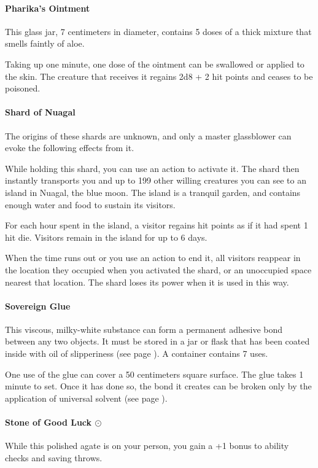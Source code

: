     \paragraph{Pharika's Ointment}
        This glass jar, 7 centimeters in diameter, contains 5 doses of a thick mixture that smells faintly of aloe.

        Taking up one minute, one dose of the ointment can be swallowed or applied to the skin.
        The creature that receives it regains 2d8 + 2 hit points and ceases to be poisoned.
    \paragraph{Shard of Nuagal}
        The origins of these shards are unknown, and only a master glassblower can evoke the following effects from it.

        While holding this shard, you can use an action to activate it.
        The shard then instantly transports you and up to 199 other willing creatures you can see to an island in Nuagal, the blue moon.
        The island is a tranquil garden, and contains enough water and food to sustain its visitors.

        For each hour spent in the island, a visitor regains hit points as if it had spent 1 hit die.
        Visitors remain in the island for up to 6 days.

        When the time runs out or you use an action to end it, all visitors reappear in the location they occupied when you activated the shard, or an unoccupied space nearest that location.
        The shard loses its power when it is used in this way.
    \paragraph{Sovereign Glue} \label{item::sovereignglue}
        This viscous, milky-white substance can form a permanent adhesive bond between any two objects.
        It must be stored in a jar or flask that has been coated inside with oil of slipperiness (see page \pageref{item::oilofslipperiness}).
        A container contains 7 uses.

        One use of the glue can cover a 50 centimeters square surface.
        The glue takes 1 minute to set.
        Once it has done so, the bond it creates can be broken only by the application of universal solvent (see page \pageref{item::universalsolvent}).
    \paragraph{Stone of Good Luck $\odot$}
        While this polished agate is on your person, you gain a +1 bonus to ability checks and saving throws.
